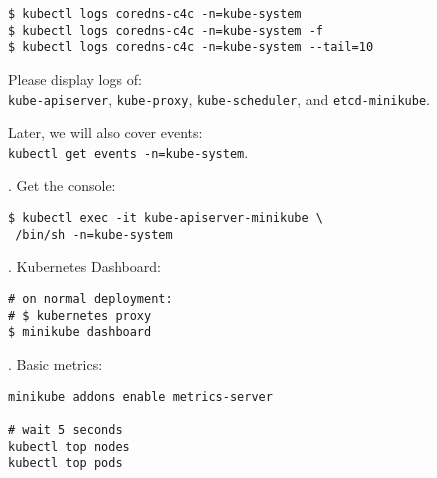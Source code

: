 \documentclass[12pt, letterpaper]{article}
\begin{document}
\begin{verbatim}
$ kubectl logs coredns-c4c -n=kube-system
$ kubectl logs coredns-c4c -n=kube-system -f
$ kubectl logs coredns-c4c -n=kube-system --tail=10
\end{verbatim}

Please display logs of:\\
\verb|kube-apiserver|, \verb|kube-proxy|, \verb|kube-scheduler|, and \verb|etcd-minikube|.


Later, we will also cover events:\\
\texttt{kubectl get events -n=kube-system}.

. Get the console:

\begin{verbatim}
$ kubectl exec -it kube-apiserver-minikube \
 /bin/sh -n=kube-system
\end{verbatim}

. Kubernetes Dashboard:

\begin{verbatim}
# on normal deployment:
# $ kubernetes proxy
$ minikube dashboard
\end{verbatim}

. Basic metrics:

\begin{verbatim}
minikube addons enable metrics-server

# wait 5 seconds
kubectl top nodes
kubectl top pods
\end{verbatim}
\end{document}
